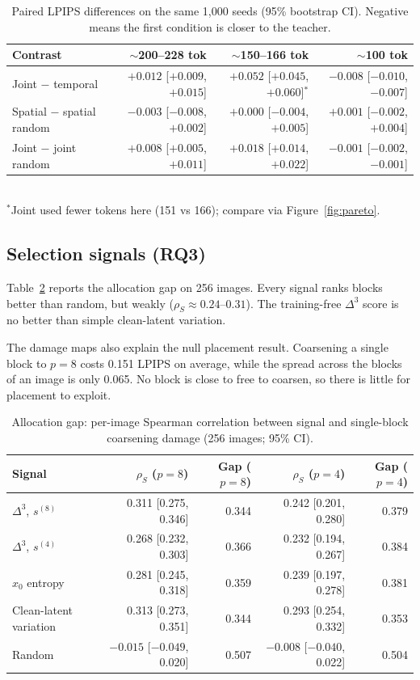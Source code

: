 \begin{table}[t]
\centering
\small
\caption{Paired LPIPS differences on the same 1,000 seeds (95\% bootstrap CI). Negative means the first condition is closer to the
teacher.}
\label{tab:contrasts}
\begin{tabular}{lrrr}
\toprule
Contrast & $\sim$200--228 tok & $\sim$150--166 tok & $\sim$100 tok \\
\midrule
Joint $-$ temporal & $+0.012$ [$+0.009$, $+0.015$] & $+0.052$ [$+0.045$, $+0.060$]$^*$ & $-0.008$ [$-0.010$, $-0.007$] \\
Spatial $-$ spatial random & $-0.003$ [$-0.008$, $+0.002$] & $+0.000$ [$-0.004$, $+0.005$] & $+0.001$ [$-0.002$, $+0.004$] \\
Joint $-$ joint random & $+0.008$ [$+0.005$, $+0.011$] & $+0.018$ [$+0.014$, $+0.022$] & $-0.001$ [$-0.002$, $-0.001$] \\
\bottomrule
\end{tabular}\\[2pt]
{\footnotesize $^*$Joint used fewer tokens here (151 vs 166); compare via Figure~\ref{fig:pareto}.}
\end{table}

\subsection{Selection signals (RQ3)}
\label{sec:gap-results}
Table~\ref{tab:gap} reports the allocation gap on 256 images. Every signal ranks blocks better than random, but weakly
($\rho_S\approx0.24$--$0.31$). The training-free $\Delta^3$ score is no better than simple clean-latent variation.

The damage maps also explain the null placement result. Coarsening a single block to $p{=}8$ costs 0.151 LPIPS on average, while the
spread across the blocks of an image is only 0.065. No block is close to free to coarsen, so there is little for placement to exploit.

\begin{table}[t]
\centering
\small
\caption{Allocation gap: per-image Spearman correlation between signal and single-block coarsening damage (256 images; 95\% CI).}
\label{tab:gap}
\begin{tabular}{lrrrr}
\toprule
Signal & $\rho_S$ ($p{=}8$) & Gap ($p{=}8$) & $\rho_S$ ($p{=}4$) & Gap ($p{=}4$) \\
\midrule
$\Delta^3$, $s^{(8)}$ & 0.311 [0.275, 0.346] & 0.344 & 0.242 [0.201, 0.280] & 0.379 \\
$\Delta^3$, $s^{(4)}$ & 0.268 [0.232, 0.303] & 0.366 & 0.232 [0.194, 0.267] & 0.384 \\
$\hat x_0$ entropy & 0.281 [0.245, 0.318] & 0.359 & 0.239 [0.197, 0.278] & 0.381 \\
Clean-latent variation & 0.313 [0.273, 0.351] & 0.344 & 0.293 [0.254, 0.332] & 0.353 \\
Random & $-0.015$ [$-0.049$, 0.020] & 0.507 & $-0.008$ [$-0.040$, 0.022] & 0.504 \\
\bottomrule
\end{tabular}
\end{table}

